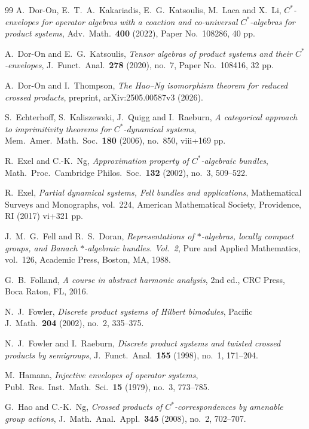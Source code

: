 \documentclass[11pt,final]{amsart}
\numberwithin{equation}{section}
\theoremstyle{plain}
\theoremstyle{definition}
\theoremstyle{remark}
\begin{document}
\begin{thebibliography}{99}
A.\ Dor-On, E.\ T.\ A.\ Kakariadis, E.\ G.\ Katsoulis, M.\ Laca and X.\ Li,
\textit{$C^*$-envelopes for operator algebras with a coaction and co-universal
$C^*$-algebras for product systems},
Adv.\ Math.\ \textbf{400} (2022), Paper No.\ 108286, 40 pp.

A.\ Dor-On and E.\ G.\ Katsoulis,
\textit{Tensor algebras of product systems and their $C^*$-envelopes},
J.\ Funct.\ Anal.\ \textbf{278} (2020), no.\ 7, Paper No.\ 108416, 32 pp.

A.\ Dor-On and I.\ Thompson,
\textit{The Hao--Ng isomorphism theorem for reduced crossed products},
preprint, arXiv:2505.00587v3 (2026).

S.\ Echterhoff, S.\ Kaliszewski, J.\ Quigg and I.\ Raeburn,
\textit{A categorical approach to imprimitivity theorems for $C^*$-dynamical systems},
Mem.\ Amer.\ Math.\ Soc.\ \textbf{180} (2006), no.\ 850, viii+169 pp.

R.\ Exel and C.-K.\ Ng,
\textit{Approximation property of $C^*$-algebraic bundles},
Math.\ Proc.\ Cambridge Philos.\ Soc.\ \textbf{132} (2002), no.\ 3, 509--522.

R.\ Exel,
\textit{Partial dynamical systems, Fell bundles and applications},
Mathematical Surveys and Monographs, vol.\ 224,
American Mathematical Society, Providence, RI (2017) vi+321 pp.

J.\ M.\ G.\ Fell and R.\ S.\ Doran,
\textit{Representations of $*$-algebras, locally compact groups, and Banach
$*$-algebraic bundles. Vol.\ 2},
Pure and Applied Mathematics, vol.\ 126,
Academic Press, Boston, MA, 1988.

G.\ B.\ Folland,
\textit{A course in abstract harmonic analysis},
2nd ed.,
CRC Press, Boca Raton, FL, 2016.

N.\ J.\ Fowler,
\textit{Discrete product systems of Hilbert bimodules},
Pacific J.\ Math.\ \textbf{204} (2002), no.\ 2, 335--375.

N.\ J.\ Fowler and I.\ Raeburn,
\textit{Discrete product systems and twisted crossed products by semigroups},
J.\ Funct.\ Anal.\ \textbf{155} (1998), no.\ 1, 171--204.

M.\ Hamana,
\textit{Injective envelopes of operator systems},
Publ.\ Res.\ Inst.\ Math.\ Sci.\ \textbf{15} (1979), no.\ 3, 773--785.

G.\ Hao and C.-K.\ Ng,
\textit{Crossed products of $C^*$-correspondences by amenable group actions},
J.\ Math.\ Anal.\ Appl.\ \textbf{345} (2008), no.\ 2, 702--707.


\end{thebibliography}
\end{document}

